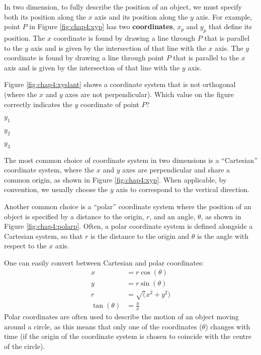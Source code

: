 In two dimension, to fully describe the position of an object, we must specify both its position along the $x$ axis and its position along the $y$ axis. For example, point $P$ in Figure \ref{fig:chap4:xyp} has two \textbf{coordinates}, $x_p$ and $y_p$ that define its position. The $x$ coordinate is found by drawing a line through $P$ that is parallel to the $y$ axis and is given by the intersection of that line with the $x$ axis. The $y$ coordinate is found by drawing a line through point $P$ that is parallel to the $x$ axis and is given by the intersection of that line with the $y$ axis.


\begin{checkpointMC}{Figure \ref{fig:chap4:xyslant} shows a coordinate system that is not orthogonal (where the $x$ and $y$ axes are not perpendicular). Which value on the figure correctly indicates the $y$ coordinate of point $P$?
}
\item $y_1$ %
\item $y_2$
\item $y_3$
\end{checkpointMC}
The most common choice of coordinate system in two dimensions is a ``Cartesian'' coordinate system, where the $x$ and $y$ axes are perpendicular and share a common origin, as shown in Figure \ref{fig:chap4:xyp}. When applicable, by convention, we usually choose the $y$ axis to correspond to the vertical direction.

Another common choice is a ``polar'' coordinate system where the position of an object is specified by a distance to the origin, $r$, and an angle, $\theta$, as shown in Figure \ref{fig:chap4:polarp}. Often, a polar coordinate system is defined alongside a Cartesian system, so that $r$ is the distance to the origin and $\theta$ is the angle with respect to the $x$ axis.

One can easily convert between Cartesian and polar coordinates:
\begin{align*}
x&=r\cos(\theta)\\
y&=r\sin(\theta)\\
r&=\sqrt(x^2+y^2)\\
\tan(\theta) &= \frac{y}{x}
\end{align*}
Polar coordinates are often used to describe the motion of an object moving around a circle, as this means that only one of the coordinates ($\theta$) changes with time (if the origin of the coordinate system is chosen to coincide with the centre of the circle).
